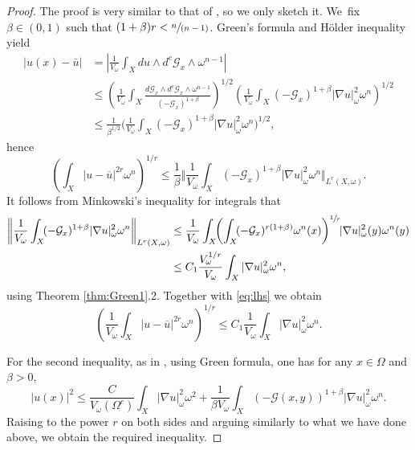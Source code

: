 \documentclass[JEP,XML,SOM,Unicode,published]{cedram}
\newcommand{\spfrac}[2]{\sfrac{#1}{(#2)}}
\theoremstyle{definition}
\begin{document}
\begin{proof}
The proof is very similar to that of \cite[Th.\,2.1 \& Lem.\,6.2]{GPSS23},
so we only sketch it. We~fix $ \beta\in (0,1)$ such that $(1+\beta)r< \spfrac{n}{n-1}$.
Green's formula and Hölder inequality yield
\begin{align*}
|u(x)-\bar u| &= \left| \frac{1}{V_\omega}\int_X du\wedge d^c {\mathcal{G}_x}\wedge \omega^{n-1} \right|\\
&\leq \left( \frac{1}{V_\omega} \int_X \frac{d \mathcal{G}_x \wedge d^c \mathcal{G}_x\wedge \omega^{n-1}}{(-\mathcal{G}_x)^{1+\beta}} \right)^{1/2} \left( \frac{1}{V_\omega}\int_X ( - \mathcal{G}_x)^{1+\beta} |\nabla u|^2_\omega \omega^n \right)^{1/2}\\
&\leq \frac{1}{\beta^{1/2}} \biggl( \frac{1}{V_\omega}\int_X ( - \mathcal{G}_x)^{1+\beta} |\nabla u|^2_\omega \omega^n \biggr)^{1/2},
\end{align*}
hence
\begin{equation}\label{eq:lhs}
\left( \int_X |u-\overline{u}|^{2r}\omega^n\right)^{1/r}
\leq\frac{1}{\beta} \biggl\Vert \frac{1}{V_\omega}\int_X ( - \mathcal{G}_x)^{1+\beta} |\nabla u|^2_\omega \omega^n \biggr\Vert_{L^r(X, \omega)}.
\end{equation}
It follows from Minkowski's inequality for integrals that
\begin{align*}
\biggl\Vert \frac{1}{V_\omega}\int_X \!( - \mathcal{G}_x)^{1+\beta} |\nabla u|^2_\omega \omega^n \biggr\Vert_{L^r(X, \omega)}
&\leq  \frac{1}{V_\omega} \int_X\!\! \left( \int_X \!( - \mathcal{G}_x)^{r(1+\beta)}\omega^n(x) \right)^{\sfrac{1}{r}}\hspace*{-1mm} |\nabla u|^2_\omega(y) \omega^n(y) \\
&\leq  C_1 \frac{V_{\omega}^{1/r}}{V_{\omega}} \int_X |\nabla u|^2_\omega \omega^n,
\end{align*}
using Theorem \ref{thm:Green1}.2.
Together with \eqref{eq:lhs} we obtain
\[
\left(\frac{1}{V_{\omega}} \int_X |u-\overline{u}|^{2r}\omega^n\right)^{1/r}
\leq C_1\frac{1}{V_{\omega}} \int_X |\nabla u|^2_\omega \omega^n.
\]

For the second inequality, as in \cite[Lem.\,6.2]{GPSS23}, using Green formula, one has for any $x\in \Omega$ and $\beta>0$,
\[
|u(x)|^2\leq \frac{C}{V_\omega(\Omega^c)}\int_X |\nabla u|^2_\omega \omega^2 + \frac{1}{ \beta V_\omega} \int_X (-\mathcal{G}(x,y))^{1+\beta}|\nabla u|^2_\omega \omega^n.
\]
Raising to the power $r$ on both sides and arguing similarly to what we have done above, we obtain the required inequality.
\end{proof}
\end{document}

